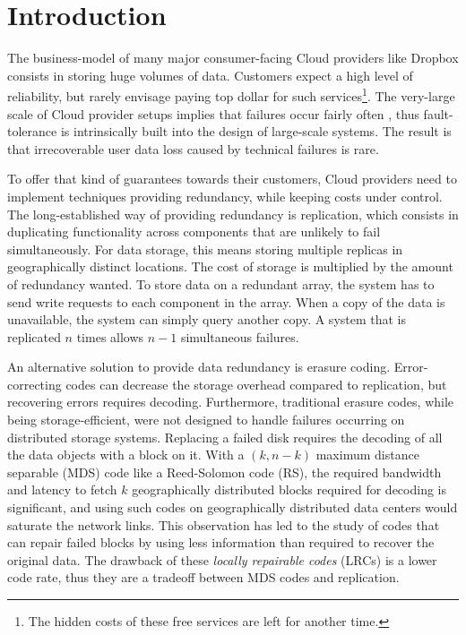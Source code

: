 \section{Introduction}
\label{sec:intro}

The business-model of many major consumer-facing Cloud providers like Dropbox consists in storing huge volumes of data. Customers expect a high level of reliability, but rarely envisage paying top dollar for such services\footnote{The hidden costs of these free services are left for another time.}. 
The very-large scale of Cloud provider setups implies that failures occur fairly often \autocite{failures-study}, thus fault-tolerance is intrinsically built into the design of large-scale systems. 
The result is that irrecoverable user data loss caused by technical failures is rare\autocite{racs}.

To offer that kind of guarantees towards their customers, Cloud providers need to implement techniques providing redundancy, while keeping costs under control. 
The long-established way of providing redundancy is replication, which consists in duplicating functionality across components that are unlikely to fail simultaneously. 
For data storage, this means storing multiple replicas in geographically distinct locations. 
The cost of storage is multiplied by the amount of redundancy wanted. 
To store data on a redundant array, the system has to send write requests to each component in the array. 
When a copy of the data is unavailable, the system can simply query another copy. 
A system that is replicated $n$ times allows $n-1$ simultaneous failures.

An alternative solution to provide data redundancy is erasure coding. 
Error-correcting codes can decrease the storage overhead compared to replication, but recovering errors requires decoding. 
Furthermore, traditional erasure codes, while being storage-efficient, were not designed to handle failures occurring on distributed storage systems. 
Replacing a failed disk requires the decoding of all the data objects with a block on it. With a $(k,n-k)$ maximum distance separable (MDS)\autocite{macwilliams1977theory} code like a Reed-Solomon code (RS), the required bandwidth and latency to fetch $k$ geographically distributed blocks required for decoding is significant, and using such codes on geographically distributed data centers would saturate the network links. 
This observation has led to the study of codes that can repair failed blocks by using less information than required to recover the original data. 
The drawback of these \emph{locally repairable codes} (LRCs) is a lower code rate, thus they are a tradeoff between MDS codes and replication.

